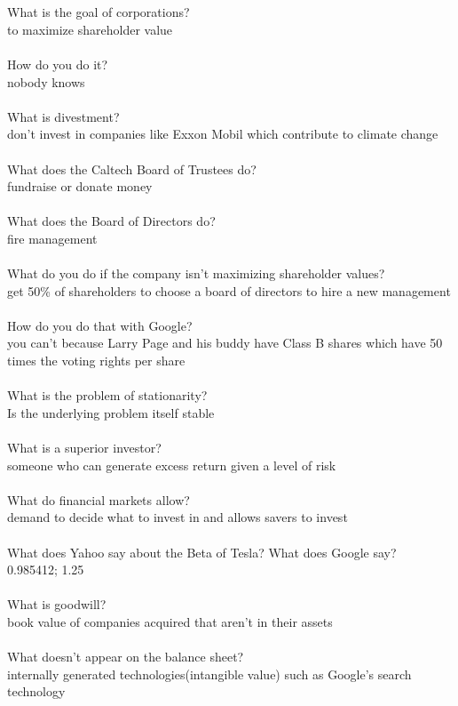 \documentclass[11pt]{article}
\begin{document}
\\\\What is the goal of corporations?
\\to maximize shareholder value
\\\\How do you do it?
\\nobody knows
\\\\What is divestment?
\\don't invest in companies like Exxon Mobil which contribute to climate change
\\\\What does the Caltech Board of Trustees do?
\\fundraise or donate money
\\\\What does the Board of Directors do?
\\fire management
\\\\What do you do if the company isn't maximizing shareholder values?
\\get 50\% of shareholders to choose a board of directors to hire a new management
\\\\How do you do that with Google?
\\you can't because Larry Page and his buddy have Class B shares which have 50 times the voting rights per share
\\\\What is the problem of stationarity?
\\Is the underlying problem itself stable
\\\\What is a superior investor?
\\someone who can generate excess return given a level of risk
\\\\What do financial markets allow?
\\demand to decide what to invest in and allows savers to invest
\\\\What does Yahoo say about the Beta of Tesla?  What does Google say?
\\0.985412; 1.25
\\\\What is goodwill?
\\book value of companies acquired that aren't in their assets
\\\\What doesn't appear on the balance sheet?
\\internally generated technologies(intangible value) such as Google's search technology
\\\\
\end{document}
